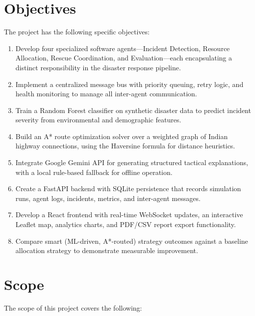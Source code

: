\section{Objectives}
\label{sec:objectives}

The project has the following specific objectives:

\begin{enumerate}[leftmargin=*]
    \item Develop four specialized software agents---Incident Detection, Resource Allocation, Rescue Coordination, and Evaluation---each encapsulating a distinct responsibility in the disaster response pipeline.

    \item Implement a centralized message bus with priority queuing, retry logic, and health monitoring to manage all inter-agent communication.

    \item Train a Random Forest classifier on synthetic disaster data to predict incident severity from environmental and demographic features.

    \item Build an A* route optimization solver over a weighted graph of Indian highway connections, using the Haversine formula for distance heuristics.

    \item Integrate Google Gemini API for generating structured tactical explanations, with a local rule-based fallback for offline operation.

    \item Create a FastAPI backend with SQLite persistence that records simulation runs, agent logs, incidents, metrics, and inter-agent messages.

    \item Develop a React frontend with real-time WebSocket updates, an interactive Leaflet map, analytics charts, and PDF/CSV report export functionality.

    \item Compare smart (ML-driven, A*-routed) strategy outcomes against a baseline allocation strategy to demonstrate measurable improvement.
\end{enumerate}

\section{Scope}
\label{sec:scope}

The scope of this project covers the following:

